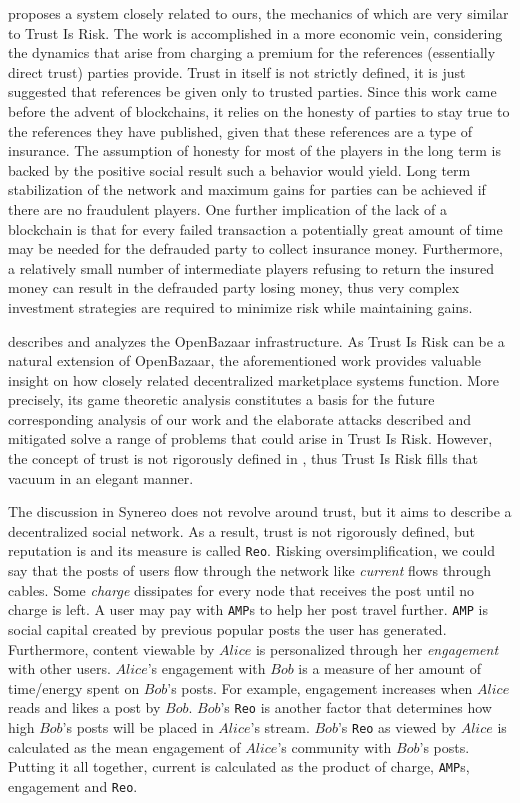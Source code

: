   \cite{davis} proposes a system closely related to ours, the mechanics of which are very similar to Trust Is Risk. The
  work is accomplished in a more economic vein, considering the dynamics that arise from charging a premium for the
  references (essentially direct trust) parties provide. Trust in itself is not strictly defined, it is just suggested that
  references be given only to trusted parties. Since this work came before the advent of blockchains, it relies on the
  honesty of parties to stay true to the references they have published, given that these references are a type of insurance.
  The assumption of honesty for most of the players in the long term is backed by the positive social result such a behavior
  would yield. Long term stabilization of the network and maximum gains for parties can be achieved if there are no
  fraudulent players. One further implication of the lack of a blockchain is that for every failed transaction a potentially
  great amount of time may be needed for the defrauded party to collect insurance money. Furthermore, a relatively small
  number of intermediate players refusing to return the insured money can result in the defrauded party losing money, thus
  very complex investment strategies are required to minimize risk while maintaining gains.

  \cite{dionyziz} describes and analyzes the OpenBazaar infrastructure. As Trust Is Risk can be a natural extension of
  OpenBazaar, the aforementioned work provides valuable insight on how closely related decentralized marketplace systems
  function. More precisely, its game theoretic analysis constitutes a basis for the future corresponding analysis of our
  work and the elaborate attacks described and mitigated solve a range of problems that could arise in Trust Is Risk.
  However, the concept of trust is not rigorously defined in \cite{dionyziz}, thus Trust Is Risk fills that vacuum in an
  elegant manner.

  The discussion in Synereo \cite{synereo} does not revolve around trust, but it aims to describe a decentralized social
  network. As a result, trust is not rigorously defined, but reputation is and its measure is called \texttt{Reo}. Risking
  oversimplification, we could say that the posts of users flow through the network like \textit{current} flows through
  cables. Some \textit{charge} dissipates for every node that receives the post until no charge is left. A user may pay with
  \texttt{AMP}s to help her post travel further. \texttt{AMP} is social capital created by previous popular posts the user
  has generated. Furthermore, content viewable by $Alice$ is personalized through her \textit{engagement} with other users.
  $Alice$'s engagement with $Bob$ is a measure of her amount of time/energy spent on $Bob$'s posts. For example, engagement
  increases when $Alice$ reads and likes a post by $Bob$. $Bob$'s \texttt{Reo} is another factor that determines how high
  $Bob$'s posts will be placed in $Alice$'s stream. $Bob$'s \texttt{Reo} as viewed by $Alice$ is calculated as the mean
  engagement of $Alice$'s community with $Bob$'s posts. Putting it all together, current is calculated as the product of
  charge, \texttt{AMP}s, engagement and \texttt{Reo}.

